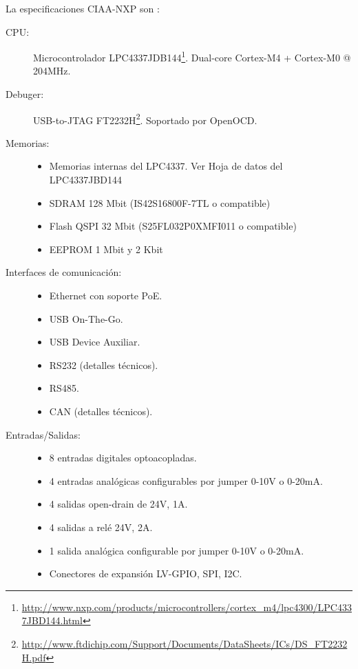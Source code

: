 La especificaciones CIAA-NXP son :
\begin{description}
  \item[CPU:] Microcontrolador LPC4337JDB144\footnote{\url{http://www.nxp.com/products/microcontrollers/cortex_m4/lpc4300/LPC4337JBD144.html}}. Dual-core Cortex-M4 + Cortex-M0 @ 204MHz.
  \item[Debuger:] USB-to-JTAG FT2232H\footnote{\url{http://www.ftdichip.com/Support/Documents/DataSheets/ICs/DS_FT2232H.pdf}}. Soportado por OpenOCD.

  \item[Memorias:]
  \hspace{1cm}
  \begin{itemize}
      \item Memorias internas del LPC4337. Ver Hoja de datos del LPC4337JBD144
      \item SDRAM 128 Mbit (IS42S16800F-7TL o compatible)
      \item Flash QSPI 32 Mbit (S25FL032P0XMFI011 o compatible)
      \item EEPROM 1 Mbit y 2 Kbit
    \end{itemize}
  \item[Interfaces de comunicación:] 
  \hspace{1cm}
    \begin{itemize}
      \item Ethernet con soporte PoE.
      \item USB On-The-Go.
      \item USB Device Auxiliar.
      \item RS232 (detalles técnicos).
      \item RS485.
      \item CAN (detalles técnicos).
    \end{itemize}
  \item[Entradas/Salidas:] 
  \hspace{1cm}
    \begin{itemize}
      \item 8 entradas digitales optoacopladas.
      \item 4 entradas analógicas configurables por jumper 0-10V o 0-20mA.
      \item 4 salidas open-drain de 24V, 1A.
      \item 4 salidas a relé 24V, 2A.
      \item 1 salida analógica configurable por jumper 0-10V o 0-20mA.
      \item Conectores de expansión LV-GPIO, SPI, I2C.
    \end{itemize}
\end{description}


